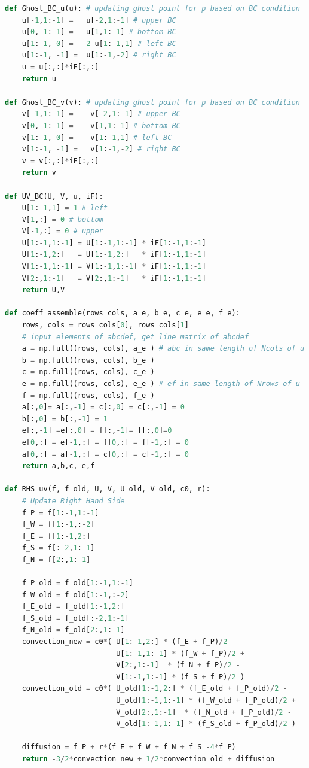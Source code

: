 \documentclass[12pt]{article}
\begin{document}
\begin{scriptsize}
\begin{lstlisting}[language=python,caption={N-S Cylinder Solver}]
def Ghost_BC_u(u): # updating ghost point for p based on BC condition
    u[-1,1:-1] =   u[-2,1:-1] # upper BC
    u[0, 1:-1] =   u[1,1:-1] # bottom BC
    u[1:-1, 0] =   2-u[1:-1,1] # left BC
    u[1:-1, -1] =  u[1:-1,-2] # right BC
    u = u[:,:]*iF[:,:]
    return u

def Ghost_BC_v(v): # updating ghost point for p based on BC condition
    v[-1,1:-1] =   -v[-2,1:-1] # upper BC
    v[0, 1:-1] =   -v[1,1:-1] # bottom BC
    v[1:-1, 0] =   -v[1:-1,1] # left BC
    v[1:-1, -1] =   v[1:-1,-2] # right BC
    v = v[:,:]*iF[:,:]
    return v

def UV_BC(U, V, u, iF):
    U[1:-1,1] = 1 # left
    V[1,:] = 0 # bottom
    V[-1,:] = 0 # upper
    U[1:-1,1:-1] = U[1:-1,1:-1] * iF[1:-1,1:-1] 
    U[1:-1,2:]   = U[1:-1,2:]   * iF[1:-1,1:-1] 
    V[1:-1,1:-1] = V[1:-1,1:-1] * iF[1:-1,1:-1] 
    V[2:,1:-1]   = V[2:,1:-1]   * iF[1:-1,1:-1]
    return U,V

def coeff_assemble(rows_cols, a_e, b_e, c_e, e_e, f_e):
    rows, cols = rows_cols[0], rows_cols[1]
    # input elements of abcdef, get line matrix of abcdef
    a = np.full((rows, cols), a_e ) # abc in same length of Ncols of u
    b = np.full((rows, cols), b_e )
    c = np.full((rows, cols), c_e )
    e = np.full((rows, cols), e_e ) # ef in same length of Nrows of u
    f = np.full((rows, cols), f_e )
    a[:,0]= a[:,-1] = c[:,0] = c[:,-1] = 0
    b[:,0] = b[:,-1] = 1
    e[:,-1] =e[:,0] = f[:,-1]= f[:,0]=0
    e[0,:] = e[-1,:] = f[0,:] = f[-1,:] = 0
    a[0,:] = a[-1,:] = c[0,:] = c[-1,:] = 0
    return a,b,c, e,f

def RHS_uv(f, f_old, U, V, U_old, V_old, c0, r): 
    # Update Right Hand Side
    f_P = f[1:-1,1:-1]
    f_W = f[1:-1,:-2]
    f_E = f[1:-1,2:]
    f_S = f[:-2,1:-1]
    f_N = f[2:,1:-1]

    f_P_old = f_old[1:-1,1:-1]
    f_W_old = f_old[1:-1,:-2]
    f_E_old = f_old[1:-1,2:]
    f_S_old = f_old[:-2,1:-1]
    f_N_old = f_old[2:,1:-1]
    convection_new = c0*( U[1:-1,2:] * (f_E + f_P)/2 -
                          U[1:-1,1:-1] * (f_W + f_P)/2 +
                          V[2:,1:-1]  * (f_N + f_P)/2 -
                          V[1:-1,1:-1] * (f_S + f_P)/2 )
    convection_old = c0*( U_old[1:-1,2:] * (f_E_old + f_P_old)/2 -
                          U_old[1:-1,1:-1] * (f_W_old + f_P_old)/2 +
                          V_old[2:,1:-1]  * (f_N_old + f_P_old)/2 -
                          V_old[1:-1,1:-1] * (f_S_old + f_P_old)/2 )
    
    diffusion = f_P + r*(f_E + f_W + f_N + f_S -4*f_P)
    return -3/2*convection_new + 1/2*convection_old + diffusion


\end{lstlisting}
\end{scriptsize}
\end{document}
